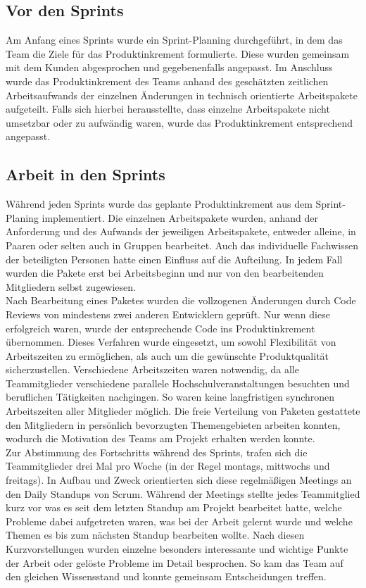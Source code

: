 \documentclass[10pt, a4paper]{article}
\begin{document}
\begin{onehalfspace}
  \subsection{Vor den Sprints}
  Am Anfang eines Sprints wurde ein Sprint-Planning durchgeführt,
  in dem das Team die Ziele für das Produktinkrement formulierte.
  Diese wurden gemeinsam mit dem Kunden abgesprochen und gegebenenfalls angepasst.
  Im Anschluss wurde das Produktinkrement des Teams anhand des geschätzten zeitlichen Arbeitsaufwands der einzelnen Änderungen in technisch orientierte Arbeitspakete aufgeteilt.
  Falls sich hierbei herausstellte, dass einzelne Arbeitspakete nicht umsetzbar oder zu aufwändig waren, wurde das Produktinkrement entsprechend angepasst.

  \subsection{Arbeit in den Sprints}
  Während jeden Sprints wurde das geplante Produktinkrement aus dem Sprint-Planing implementiert.
  Die einzelnen Arbeitspakete wurden, anhand der Anforderung und des Aufwands der jeweiligen Arbeitspakete, entweder alleine, in Paaren oder selten auch in Gruppen bearbeitet.
  Auch das individuelle Fachwissen der beteiligten Personen hatte einen Einfluss auf die Aufteilung.
  In jedem Fall wurden die Pakete erst bei Arbeitsbeginn und nur von den bearbeitenden Mitgliedern selbst zugewiesen.
  \\
  Nach Bearbeitung eines Paketes wurden die vollzogenen Änderungen durch Code Reviews von mindestens zwei anderen Entwicklern geprüft.
  Nur wenn diese erfolgreich waren, wurde der entsprechende Code ins Produktinkrement übernommen.
  Dieses Verfahren wurde eingesetzt, um sowohl Flexibilität von Arbeitszeiten zu ermöglichen, als auch um die gewünschte Produktqualität sicherzustellen.
  Verschiedene Arbeitszeiten waren notwendig, da alle Teammitglieder verschiedene parallele Hochschulveranstaltungen besuchten und beruflichen Tätigkeiten nachgingen.
  So waren keine langfristigen synchronen Arbeitszeiten aller Mitglieder möglich.
  Die freie Verteilung von Paketen gestattete den Mitgliedern in persönlich bevorzugten Themengebieten arbeiten konnten, wodurch die Motivation des Teams am Projekt erhalten werden konnte.
  \\
  Zur Abstimmung des Fortschritts während des Sprints, trafen sich die Teammitglieder drei Mal pro Woche (in der Regel montags, mittwochs und freitags).
  In Aufbau und Zweck orientierten sich diese regelmäßigen Meetings an den \glqq Daily Standups\grqq{} von Scrum.
  Während der Meetings stellte jedes Teammitglied kurz vor was es seit dem letzten Standup am Projekt bearbeitet hatte, welche Probleme dabei aufgetreten waren, was bei der Arbeit gelernt wurde und welche Themen es bis zum nächsten Standup bearbeiten wollte.
  Nach diesen Kurzvorstellungen wurden einzelne besonders interessante und wichtige Punkte der Arbeit oder gelöste Probleme im Detail besprochen.
  So kam das Team auf den gleichen Wissensstand und konnte gemeinsam Entscheidungen treffen.


\end{onehalfspace}
\end{document}
